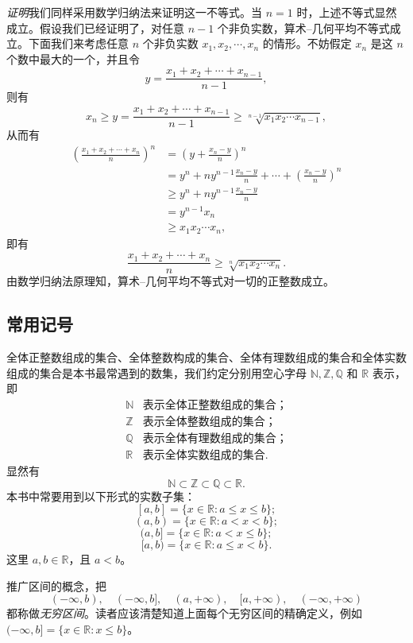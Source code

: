\documentclass[UTF8,12pt,a4paper,fontset=fandol]{ctexbook}
\begin{document}
\noindent\emph{证明}\quad 我们同样采用数学归纳法来证明这一不等式。当 $n=1$ 时，上述不等式显然成立。假设我们已经证明了，对任意 $n-1$ 个非负实数，算术--几何平均不等式成立。下面我们来考虑任意 $n$ 个非负实数 $x_1,x_2,\cdots,x_n$ 的情形。不妨假定 $x_n$ 是这 $n$ 个数中最大的一个，并且令
\[
  y=\frac{x_1+x_2+\cdots+x_{n-1}}{n-1},
\]
则有
\[
  x_n\geqslant y=\frac{x_1+x_2+\cdots+x_{n-1}}{n-1}
  \geqslant \sqrt[n-1]{x_1x_2\cdots x_{n-1}},
\]
从而有
\[
\begin{aligned}
  \left(\frac{x_1+x_2+\cdots+x_n}{n}\right)^n
  &=\left(y+\frac{x_n-y}{n}\right)^n\\
  &=y^n+ny^{n-1}\frac{x_n-y}{n}+\cdots+\left(\frac{x_n-y}{n}\right)^n\\
  &\geqslant y^n+ny^{n-1}\frac{x_n-y}{n}\\
  &=y^{n-1}x_n\\
  &\geqslant x_1x_2\cdots x_n,
\end{aligned}
\]
即有
\[
  \frac{x_1+x_2+\cdots+x_n}{n}\geqslant \sqrt[n]{x_1x_2\cdots x_n}.
\]
由数学归纳法原理知，算术--几何平均不等式对一切的正整数成立。

\subsection{常用记号}

全体正整数组成的集合、全体整数构成的集合、全体有理数组成的集合和全体实数组成的集合是本书最常遇到的数集，我们约定分别用空心字母 $\mathbb{N},\mathbb{Z},\mathbb{Q}$ 和 $\mathbb{R}$ 表示，即
\[
\begin{array}{ll}
  \mathbb{N} & \text{表示全体正整数组成的集合；}\\
  \mathbb{Z} & \text{表示全体整数组成的集合；}\\
  \mathbb{Q} & \text{表示全体有理数组成的集合；}\\
  \mathbb{R} & \text{表示全体实数组成的集合.}
\end{array}
\]
显然有
\[
  \mathbb{N}\subset\mathbb{Z}\subset\mathbb{Q}\subset\mathbb{R}.
\]
本书中常要用到以下形式的实数子集：
\[
  [a,b]=\{x\in\mathbb{R}:a\leqslant x\leqslant b\};
\]
\[
  (a,b)=\{x\in\mathbb{R}:a<x<b\};
\]
\[
  (a,b]=\{x\in\mathbb{R}:a<x\leqslant b\};
\]
\[
  [a,b)=\{x\in\mathbb{R}:a\leqslant x<b\}.
\]
这里 $a,b\in\mathbb{R}$，且 $a<b$。

推广区间的概念，把
\[
  (-\infty,b),\quad (-\infty,b],\quad (a,+\infty),\quad [a,+\infty),\quad (-\infty,+\infty)
\]
都称做\emph{无穷区间}。读者应该清楚知道上面每个无穷区间的精确定义，例如 $(-\infty,b]=\{x\in\mathbb{R}:x\leqslant b\}$。
\end{document}
